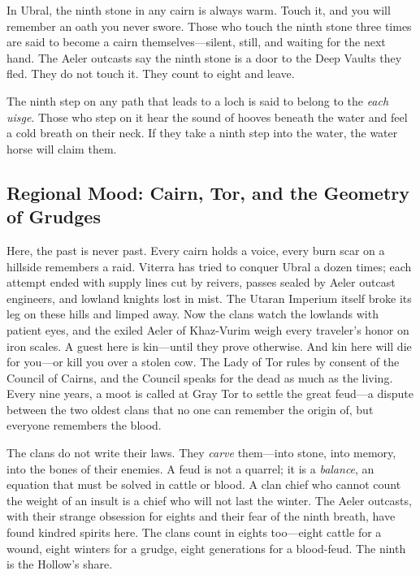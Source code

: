 \begin{tcolorbox}[colback=black!3,colframe=red!60!black,title={The Ninth Taboo Manifestation},breakable]
In Ubral, the ninth stone in any cairn is always warm. Touch it, and you will remember an oath you never swore. Those who touch the ninth stone three times are said to become a cairn themselves---silent, still, and waiting for the next hand. The Aeler outcasts say the ninth stone is a door to the Deep Vaults they fled. They do not touch it. They count to eight and leave.

The ninth step on any path that leads to a loch is said to belong to the \textit{each uisge}. Those who step on it hear the sound of hooves beneath the water and feel a cold breath on their neck. If they take a ninth step into the water, the water horse will claim them.
\end{tcolorbox}

\subsection*{Regional Mood: Cairn, Tor, and the Geometry of Grudges}

Here, the past is never past. Every cairn holds a voice, every burn scar on a hillside remembers a raid. Viterra has tried to conquer Ubral a dozen times; each attempt ended with supply lines cut by reivers, passes sealed by Aeler outcast engineers, and lowland knights lost in mist. The Utaran Imperium itself broke its leg on these hills and limped away. Now the clans watch the lowlands with patient eyes, and the exiled Aeler of Khaz-Vurim weigh every traveler's honor on iron scales. A guest here is kin---until they prove otherwise. And kin here will die for you---or kill you over a stolen cow. The Lady of Tor rules by consent of the Council of Cairns, and the Council speaks for the dead as much as the living. Every nine years, a moot is called at Gray Tor to settle the great feud---a dispute between the two oldest clans that no one can remember the origin of, but everyone remembers the blood.

The clans do not write their laws. They \textit{carve} them---into stone, into memory, into the bones of their enemies. A feud is not a quarrel; it is a \textit{balance}, an equation that must be solved in cattle or blood. A clan chief who cannot count the weight of an insult is a chief who will not last the winter. The Aeler outcasts, with their strange obsession for eights and their fear of the ninth breath, have found kindred spirits here. The clans count in eights too---eight cattle for a wound, eight winters for a grudge, eight generations for a blood-feud. The ninth is the Hollow's share.

